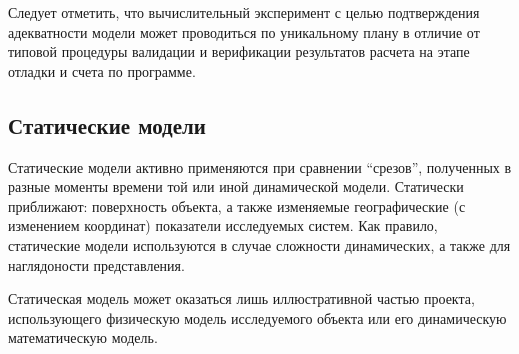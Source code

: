 \documentclass[12pt]{article}
\begin{document}
Следует отметить, что вычислительный эксперимент с целью подтверждения адекватности модели может проводиться по уникальному плану в отличие от типовой процедуры валидации и верификации результатов расчета на этапе отладки и счета по программе.

\subsection{Статические модели}
Статические модели активно применяются при сравнении \enquote{срезов}, полученных в разные моменты времени той или иной динамической модели. Статически приближают: поверхность объекта, а также изменяемые географические (с изменением координат) показатели исследуемых систем. Как правило, статические модели используются в случае сложности динамических, а также для наглядоности представления.

Статическая модель может оказаться лишь иллюстративной частью проекта, использующего физическую модель исследуемого объекта или его динамическую математическую модель.
\end{document}
